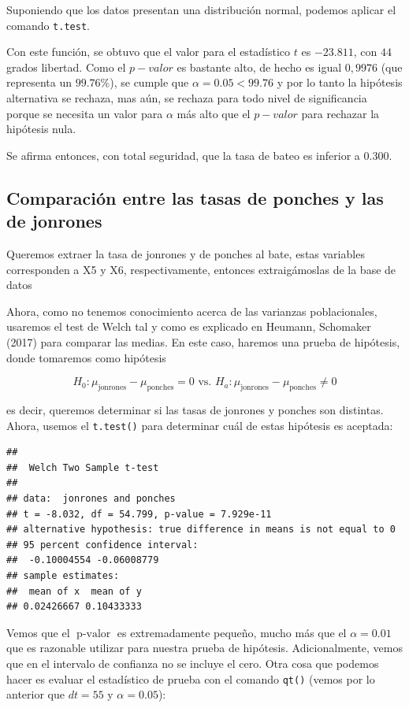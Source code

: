 \documentclass{staprojteamusb}
\begin{document}
 Suponiendo que los datos presentan una distribución normal, podemos aplicar el comando \texttt{t.test}.

 Con este función, se obtuvo que el valor para el estadístico \(t\) es \(-23.811\), con \(44\) grados libertad. Como el \(p-valor\) es bastante alto, de hecho es igual \(0,9976\) (que representa un \(99.76\%\)), se cumple que \(\alpha=0.05<99.76\) y por lo tanto la hipótesis alternativa se rechaza, mas aún, se rechaza para todo nivel de significancia porque se necesita un valor para \(\alpha\) más alto que el \(p-valor\) para rechazar la hipótesis nula.

 Se afirma entonces, con total seguridad, que la tasa de bateo es inferior a \(0.300\).

 \hypertarget{comparaciuxf3n-entre-las-tasas-de-ponches-y-las-de-jonrones}{%
 \subsection{Comparación entre las tasas de ponches y las de jonrones}\label{comparaciuxf3n-entre-las-tasas-de-ponches-y-las-de-jonrones}}

 Queremos extraer la tasa de jonrones y de ponches al bate, estas variables corresponden a X5 y X6, respectivamente, entonces extraigámoslas de la base de datos

 Ahora, como no tenemos conocimiento acerca de las varianzas poblacionales, usaremos el test de Welch tal y como es explicado en Heumann, Schomaker (2017) para comparar las medias. En este caso, haremos una prueba de hipótesis, donde tomaremos como hipótesis

 \[
 H_0 : \mu_{\operatorname{jonrones}} - \mu_{\operatorname{ponches}} = 0 \text{ vs. } H_a : \mu_{\operatorname{jonrones}} - \mu_{\operatorname{ponches}} \neq 0
 \]

 es decir, queremos determinar si las tasas de jonrones y ponches son distintas. Ahora, usemos el \texttt{t.test()} para determinar cuál de estas hipótesis es aceptada:

\begin{verbatim}
## 
##  Welch Two Sample t-test
## 
## data:  jonrones and ponches
## t = -8.032, df = 54.799, p-value = 7.929e-11
## alternative hypothesis: true difference in means is not equal to 0
## 95 percent confidence interval:
##  -0.10004554 -0.06008779
## sample estimates:
##  mean of x  mean of y 
## 0.02426667 0.10433333
\end{verbatim}

 Vemos que el \(\operatorname{p-valor}\) es extremadamente pequeño, mucho más que el \(\alpha = 0.01\) que es razonable utilizar para nuestra prueba de hipótesis. Adicionalmente, vemos que en el intervalo de confianza no se incluye el cero. Otra cosa que podemos hacer es evaluar el estadístico de prueba con el comando \texttt{qt()} (vemos por lo anterior que \(dt = 55\) y \(\alpha = 0.05\)):
\end{document}

